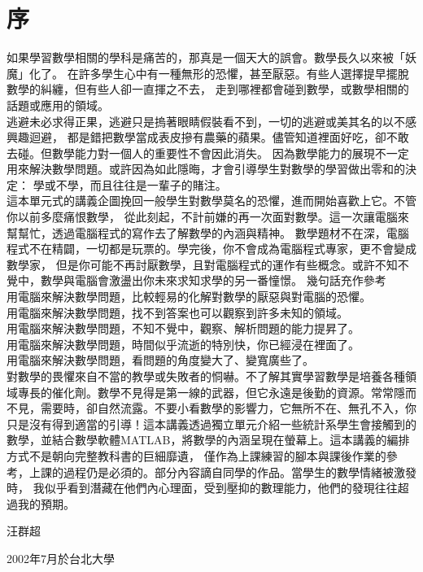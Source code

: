 \chapter*{序}

如果學習數學相關的學科是痛苦的，那真是一個天大的誤會。數學長久以來被「妖魔」化了。
在許多學生心中有一種無形的恐懼，甚至厭惡。有些人選擇提早擺脫數學的糾纏，但有些人卻一直揮之不去，
走到哪裡都會碰到數學，或數學相關的話題或應用的領域。\\

逃避未必求得正果，逃避只是摀著眼睛假裝看不到，一切的逃避或美其名的以不感興趣迴避，
都是錯把數學當成表皮摻有農藥的蘋果。儘管知道裡面好吃，卻不敢去碰。但數學能力對一個人的重要性不會因此消失。
因為數學能力的展現不一定用來解決數學問題。或許因為如此隱晦，才會引導學生對數學的學習做出零和的決定：
學或不學，而且往往是一輩子的賭注。\\

這本單元式的講義企圖挽回一般學生對數學莫名的恐懼，進而開始喜歡上它。不管你以前多麼痛恨數學，
從此刻起，不計前嫌的再一次面對數學。這一次讓電腦來幫幫忙，透過電腦程式的寫作去了解數學的內涵與精神。
數學題材不在深，電腦程式不在精闢，一切都是玩票的。學完後，你不會成為電腦程式專家，更不會變成數學家，
但是你可能不再討厭數學，且對電腦程式的運作有些概念。或許不知不覺中，數學與電腦會激盪出你未來求知求學的另一番憧憬。
幾句話充作參考\\

用電腦來解決數學問題，比較輕易的化解對數學的厭惡與對電腦的恐懼。\\
用電腦來解決數學問題，找不到答案也可以觀察到許多未知的領域。\\
用電腦來解決數學問題，不知不覺中，觀察、解析問題的能力提昇了。\\
用電腦來解決數學問題，時間似乎流逝的特別快，你已經浸在裡面了。\\
用電腦來解決數學問題，看問題的角度變大了、變寬廣些了。\\

對數學的畏懼來自不當的教學或失敗者的恫嚇。不了解其實學習數學是培養各種領域專長的催化劑。數學不見得是第一線的武器，但它永遠是後勤的資源。常常隱而不見，需要時，卻自然流露。不要小看數學的影響力，它無所不在、無孔不入，你只是沒有得到適當的引導！這本講義透過獨立單元介紹一些統計系學生會接觸到的數學，並結合數學軟體MATLAB，將數學的內涵呈現在螢幕上。這本講義的編排方式不是朝向完整教科書的巨細靡遺，
僅作為上課練習的腳本與課後作業的參考，上課的過程仍是必須的。部分內容謫自同學的作品。當學生的數學情緒被激發時，
我似乎看到潛藏在他們內心理面，受到壓抑的數理能力，他們的發現往往超過我的預期。

\begin{flushright}
    汪群超
    \par\vspace*{-2pt}\hfill 2002年7月於台北大學
\end{flushright}
